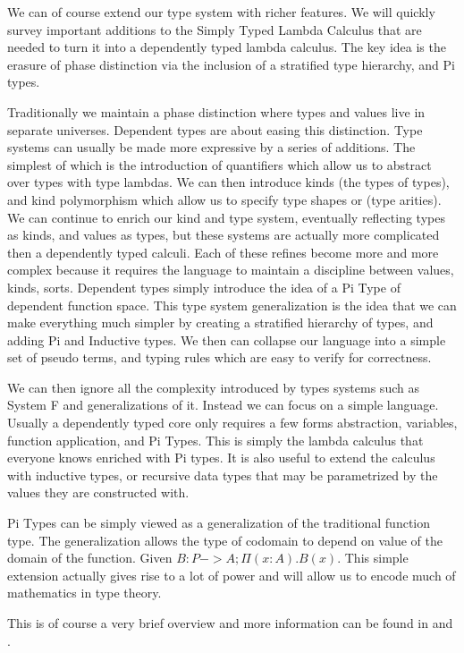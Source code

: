 We can of course extend our type system with richer features. We will quickly survey important additions to the Simply
Typed Lambda Calculus that are needed to turn it into a dependently typed lambda calculus. The key idea is the erasure
of phase distinction via the inclusion of a stratified type hierarchy, and Pi types.

Traditionally we maintain a phase distinction where types and values live in separate universes. Dependent types
are about easing this distinction. Type systems can usually be made more expressive by a series of additions.
The simplest of which is the introduction of quantifiers which allow us to abstract over types with type lambdas.
We can then introduce kinds (the types of types), and kind polymorphism which allow us to specify type shapes or (type arities).
We can continue to enrich our kind and type system, eventually reflecting types as kinds, and values as types,
but these systems are actually more complicated then a dependently typed calculi. Each of these refines become
more and more complex because it requires the language to maintain a discipline between values, kinds, sorts.
Dependent types simply introduce the idea of a Pi Type of dependent function space. This type system generalization is the
idea that we can make everything much simpler by creating a stratified hierarchy of types, and adding Pi and Inductive types.
We then can collapse our language into a simple set of pseudo terms, and typing rules which are easy to verify for correctness.

We can then ignore all the complexity introduced by types systems such as System F and generalizations of it. Instead we can
focus on a simple language. Usually a dependently typed core only requires a few forms abstraction, variables, function application,
and Pi Types. This is simply the lambda calculus that everyone knows enriched with Pi types. It is also useful to extend the calculus
with inductive types, or recursive data types that may be parametrized by the values they are constructed with.

Pi Types can be simply viewed as a generalization of the traditional function type. The generalization
allows the type of codomain to depend on value of the domain of the function. Given $B : P -> A; \Pi (x : A). B(x)$. This
simple extension actually gives rise to a lot of power and will allow us to encode much of mathematics in type theory.

This is of course a very brief overview and more information can be found in \cite{Pierce:TypeSystems} \cite{martinlof} and \cite{HoTTbook}.

